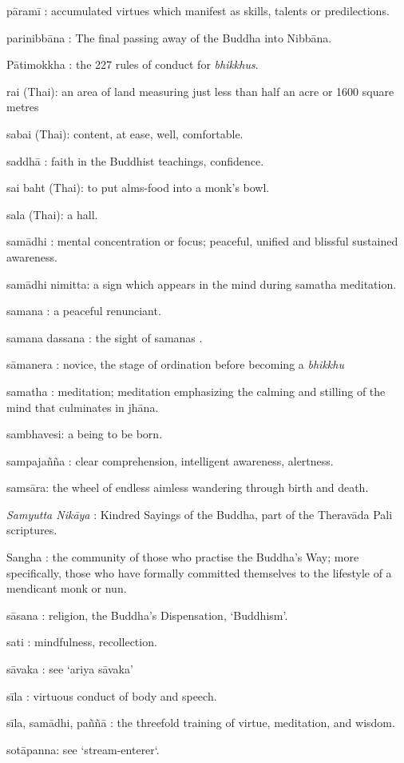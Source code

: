 pāramī : accumulated virtues which manifest as skills, talents or
predilections.

parinibbāna : The final passing away of the Buddha into Nibbāna.

Pātimokkha : the 227 rules of conduct for \emph{bhikkhus}.

rai (Thai): an area of land measuring just less than half an acre or
1600 square metres

sabai (Thai): content, at ease, well, comfortable.

saddhā : faith in the Buddhist teachings, confidence.

sai baht (Thai): to put alms-food into a monk's bowl.

sala (Thai): a hall.

samādhi : mental concentration or focus; peaceful, unified and blissful
sustained awareness.

samādhi nimitta: a sign which appears in the mind during samatha
meditation.

samana : a peaceful renunciant.

samana dassana : the sight of samanas .

sāmanera : novice, the stage of ordination before becoming a
\emph{bhikkhu}

samatha : meditation; meditation emphasizing the calming and stilling of
the mind that culminates in jhāna.

sambhavesi: a being to be born.

sampajañña : clear comprehension, intelligent awareness, alertness.

samsāra: the wheel of endless aimless wandering through birth and death.

\emph{Samyutta Nikāya} : Kindred Sayings of the Buddha, part of the
Theravāda‎ Pali scriptures.

Sangha : the community of those who practise the Buddha's Way; more
specifically, those who have formally committed themselves to the
lifestyle of a mendicant monk or nun.

sāsana : religion, the Buddha's Dispensation, `Buddhism'.

sati : mindfulness, recollection.

sāvaka : see `ariya sāvaka'

sīla : virtuous conduct of body and speech.

sīla, samādhi, paññā : the threefold training of virtue, meditation, and
wisdom.

sotāpanna: see `stream-enterer`.

